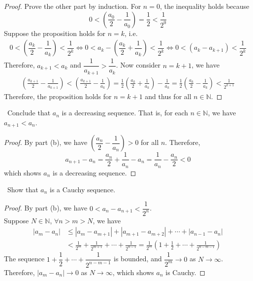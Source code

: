 \documentclass[12pt,a4paper]{amsart}
\newcommand{\bbN}{\mathbb{N}}
\newcommand{\turnin}{\faPencilSquareO}
\begin{document}
\begin{compactenum}[(a)]
\begin{proof}
\noindent
Prove the other part by induction. For $n=0$, the inequality holds because
$$ 0 < \left(\frac{a_0}{2} - \frac{1}{a_0}\right) = \frac{1}{2}<\frac{1}{2^0} $$
Suppose the proposition holds for $n=k$, i.e.
\begin{align*}
0 < \left(\dfrac{a_k}{2} - \dfrac{1}{a_k}\right) < \dfrac{1}{2^k}
\Leftrightarrow
0 < a_k - \left(\dfrac{a_k}{2} + \dfrac{1}{a_k}\right) < \dfrac{1}{2^k}
\Leftrightarrow
0 < (a_k - a_{k+1}) < \dfrac{1}{2^k}
\end{align*}
Therefore, $a_{k+1} < a_k$ and $\dfrac{1}{a_{k+1}} > \dfrac{1}{a_k}$.
Now consider $n=k+1$, we have
\begin{align*}
\left(\frac{a_{k+1}}{2} - \frac{1}{a_{k+1}}\right)
  < \left(\frac{a_{k+1}}{2} - \frac{1}{a_{k}}\right)
  = \frac{1}{2}\left(\frac{a_{k}}{2} + \frac{1}{a_{k}}\right) - \frac{1}{a_k}
  = \frac{1}{2}\left(\frac{a_{k}}{2} - \frac{1}{a_{k}}\right)
  < \frac{1}{2^{k+1}}
\end{align*}
Therefore, the proposition holds for $n=k+1$ and thus for all $n \in\bbN$.
\end{proof}

\item \turnin\ Conclude that $a_n$ is a decreasing sequence.
  That is, for each $n \in \bbN$, we have $a_{n+1} < a_n$.

\begin{proof}
By part (b), we have $\left(\dfrac{a_n}{2} - \dfrac{1}{a_n}\right)>0$ for all $n$. Therefore,
$$ a_{n+1} - a_n = \frac{a_n}{2} + \frac{1}{a_n} - a_n = \frac{1}{a_n} - \frac{a_n}{2} < 0 $$
which shows $a_n$ is a decreasing sequence.
\end{proof}

\item \turnin\ Show that $a_n$ is a Cauchy sequence.

\begin{proof}
By part (b), we have $0 < a_n - a_{n+1} < \dfrac{1}{2^n}$. \\
\noindent
Suppose $N \in\bbN$, $\forall n > m > N$, we have
\begin{align*}
|a_m - a_n| &\le |a_{m} - a_{m+1}| + |a_{m+1} - a_{m+2}| + \cdots + |a_{n-1} - a_{n}|  \\
&< \frac{1}{2^m} + \frac{1}{2^{m+1}} + \cdots + \frac{1}{2^{n-1}}
= \frac{1}{2^m} \left(1 + \frac{1}{2} + \cdots + \frac{1}{2^{n-m-1}} \right)
\end{align*}
The sequence $1 + \dfrac{1}{2} + \cdots + \dfrac{1}{2^{n-m-1}}$ is bounded, and
$\dfrac{1}{2^m} \to 0$ as $N\to\infty$. Therefore, $|a_m - a_n| \to 0$ as $N\to\infty$,
which shows $a_n$ is Cauchy.
\end{proof}


\end{compactenum}
\end{document}
